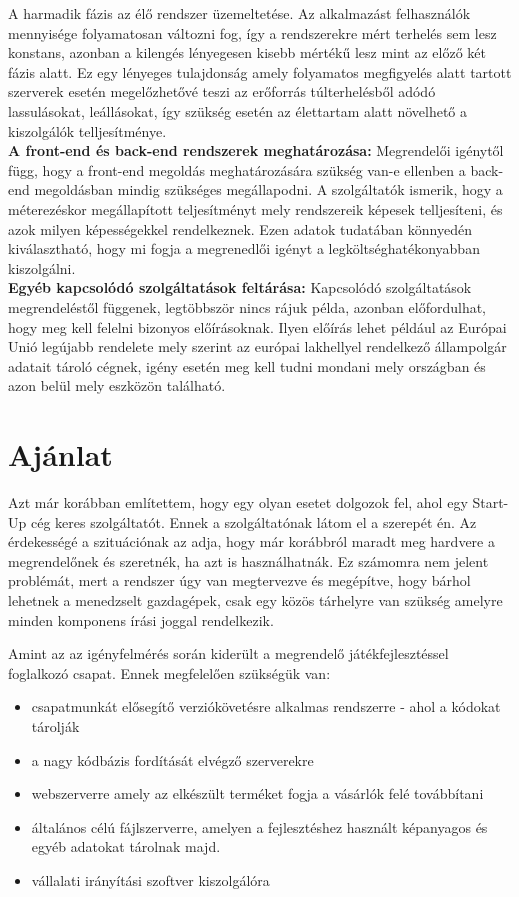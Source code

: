 \documentclass[12pt,oneside,justify,table]{book}
\begin{document}
A harmadik fázis az élő rendszer üzemeltetése. Az alkalmazást felhasználók mennyisége folyamatosan változni fog, így a rendszerekre mért terhelés sem lesz konstans, azonban a kilengés lényegesen kisebb mértékű lesz mint az előző két fázis alatt. Ez egy lényeges tulajdonság amely folyamatos megfigyelés alatt tartott szerverek esetén megelőzhetővé teszi az erőforrás túlterhelésből adódó lassulásokat, leállásokat, így szükség esetén az élettartam alatt növelhető a kiszolgálók telljesítménye.  \\
\indent \textbf{A front-end és back-end rendszerek meghatározása:} Megrendelői igénytől függ, hogy a front-end megoldás meghatározására szükség van-e ellenben a back-end megoldásban mindig szükséges megállapodni. A szolgáltatók ismerik, hogy a méterezéskor megállapított teljesítményt mely rendszereik képesek telljesíteni, és azok milyen képességekkel rendelkeznek. Ezen adatok tudatában könnyedén kiválasztható, hogy mi fogja a megrenedlői igényt a legköltséghatékonyabban kiszolgálni. \\
\indent \textbf{Egyéb kapcsolódó szolgáltatások feltárása:} Kapcsolódó szolgáltatások megrendeléstől függenek, legtöbbször nincs rájuk példa, azonban előfordulhat, hogy meg kell felelni bizonyos előírásoknak. Ilyen előírás lehet például az Európai Unió legújabb rendelete mely szerint az európai lakhellyel rendelkező állampolgár adatait tároló cégnek, igény esetén meg kell tudni mondani mely országban és azon belül mely eszközön található. \\


\section{Ajánlat}
Azt már korábban említettem, hogy egy olyan esetet dolgozok fel, ahol egy Start-Up cég keres szolgáltatót. Ennek a szolgáltatónak látom el a szerepét én. Az érdekességé a szituációnak az adja, hogy már korábbról maradt meg hardvere a megrendelőnek és szeretnék, ha azt is használhatnák. Ez számomra nem jelent problémát, mert a rendszer úgy van megtervezve és megépítve, hogy bárhol lehetnek a menedzselt gazdagépek, csak egy közös tárhelyre van szükség amelyre minden komponens írási joggal rendelkezik.  

Amint az az igényfelmérés során kiderült a megrendelő játékfejlesztéssel foglalkozó csapat. Ennek megfelelően szükségük van: 
\begin{itemize}
\item csapatmunkát elősegítő verziókövetésre alkalmas rendszerre - ahol a kódokat tárolják 
\item a nagy kódbázis fordítását elvégző szerverekre 
\item webszerverre amely az elkészült terméket fogja a vásárlók felé továbbítani 
\item általános célú fájlszerverre, amelyen a fejlesztéshez használt képanyagos és egyéb adatokat tárolnak majd.
\item vállalati irányítási szoftver kiszolgálóra
\end{itemize}
\end{document}
